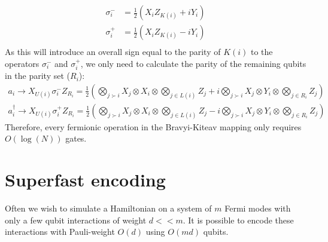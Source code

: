 \documentclass[twoside]{article}
\begin{document}
\begin{itemlist}
        \begin{equation}
                \begin{align}
                        \sigma^-_i &= \frac{1}{2}(X_i Z_{K(i)} + i Y_i) \\
                        \sigma^+_i &= \frac{1}{2}(X_i Z_{K(i)} - i Y_i) \\
                \end{align}
        \end{equation}
        As this will introduce an overall sign equal to the parity of $K(i)$ to the operators  $\sigma^-_i$ and $\sigma^+_i$, we only need to calculate the parity of the remaining qubits in the parity set ($R_i$):
        \begin{equation}
                \begin{align}
                a_i \rightarrow X_{U(i)}  \sigma^-_i  Z_{R_i} = \frac{1}{2}\left( \bigotimes_{j \succ i} X_j \otimes X_i \otimes \bigotimes_{j \in L(i)} Z_j + i \bigotimes_{j \succ i} X_j \otimes Y_i\otimes \bigotimes_{j \in R_i} Z_j \right) \\
                a^{\dagger}_i \rightarrow X_{U(i)}  \sigma^+_iZ_{R_i} = \frac{1}{2}\left( \bigotimes_{j \succ i} X_j \otimes X_i \otimes \bigotimes_{j \in L(i)} Z_j - i \bigotimes_{j \succ i} X_j \otimes Y_i\otimes \bigotimes_{j \in R_i} Z_j \right) 
                \end{align}
        \end{equation}
        Therefore, every fermionic operation in the Bravyi-Kiteav mapping only requires $O(\log(N))$ gates.
\end{itemlist}
\section{Superfast encoding}
Often we wish to simulate a Hamiltonian on a system of $m$ Fermi modes with only a few qubit interactions of weight $d << m$. It is possible to encode these interactions with Pauli-weight $O(d)$ using $O(md)$ qubits. 
\end{document}
